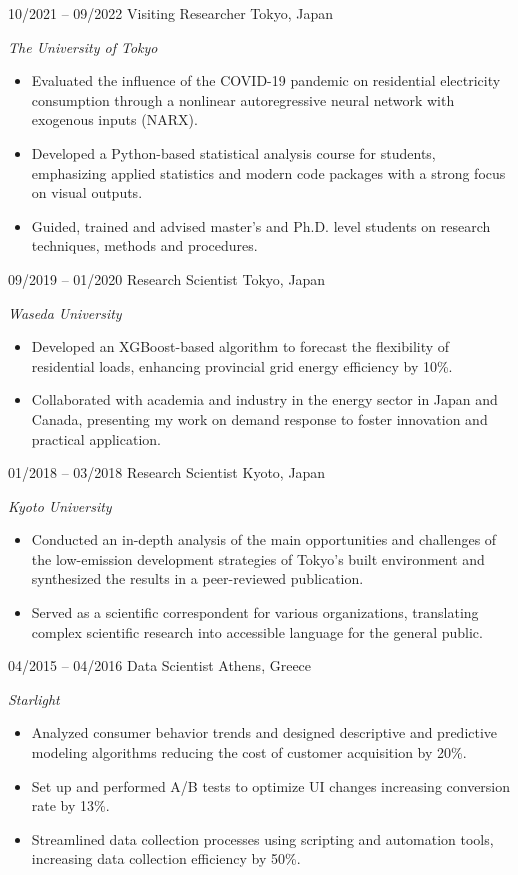
\begin{entrylist}
\entry
{10/2021 -- 09/2022}
{Visiting Researcher}
{Tokyo, Japan}
{\emph{The University of Tokyo}
\begin{itemize}
	\item Evaluated the influence of the COVID-19 pandemic on residential electricity consumption through a nonlinear autoregressive neural network with exogenous inputs (NARX).
 	\item Developed a Python-based statistical analysis course for students, emphasizing applied statistics and modern code packages with a strong focus on visual outputs.
	\item Guided, trained and advised master's and Ph.D. level students on research techniques, methods and procedures.
\end{itemize}
}

\entry
{09/2019 -- 01/2020}
{Research Scientist}
{Tokyo, Japan}
{\emph{Waseda University}
\begin{itemize}
\item Developed an XGBoost-based algorithm to forecast the flexibility of residential loads, enhancing provincial grid energy efficiency by 10\%.
\item Collaborated with academia and industry in the energy sector in Japan and Canada, presenting my work on demand response to foster innovation and practical application.
\end{itemize}
}
\end{entrylist}
\begin{entrylist}
\entry
{01/2018 -- 03/2018}
{Research Scientist}
{Kyoto, Japan}
{\emph{Kyoto University}
\begin{itemize}
\item Conducted an in-depth analysis of the main opportunities and challenges of the low-emission development strategies of Tokyo’s built environment and synthesized the results in a peer-reviewed publication.
\item Served as a scientific correspondent for various organizations, translating complex scientific research into accessible language for the general public.
\end{itemize}
}
\end{entrylist}
\begin{entrylist}
\entry
{04/2015 -- 04/2016}
{Data Scientist}
{Athens, Greece}
{\emph{Starlight}
\begin{itemize}
\item	Analyzed consumer behavior trends and designed descriptive and predictive modeling algorithms reducing the cost of customer acquisition by 20\%.
\item	Set up and performed A/B tests to optimize UI changes increasing conversion rate by 13\%.
\item	Streamlined data collection processes using scripting and automation tools, increasing data collection efficiency by 50\%.
\end{itemize}}
\end{entrylist}
